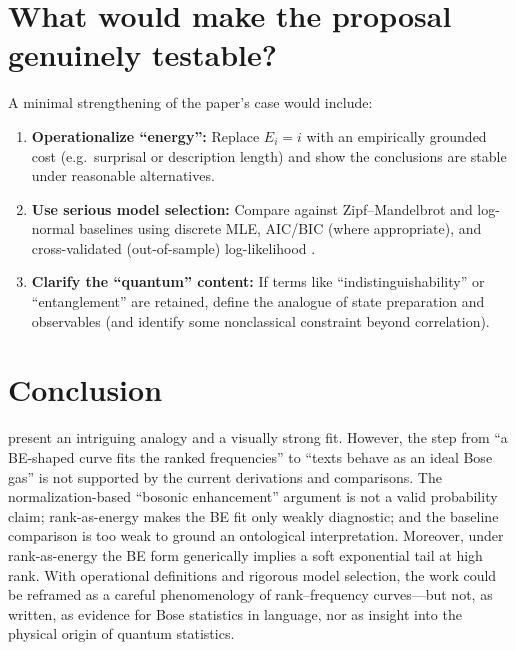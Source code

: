 \documentclass[11pt,a4paper]{article}
\begin{document}
\section{What would make the proposal genuinely testable?}
A minimal strengthening of the paper’s case would include:
\begin{enumerate}
\item \textbf{Operationalize ``energy'':} Replace $E_i=i$ with an empirically grounded cost (e.g.\ surprisal or description length) and show the conclusions are stable under reasonable alternatives.
\item \textbf{Use serious model selection:} Compare against Zipf--Mandelbrot and log-normal baselines using discrete MLE, AIC/BIC (where appropriate), and cross-validated (out-of-sample) log-likelihood \citep{Clauset2009}.
\item \textbf{Clarify the ``quantum'' content:} If terms like ``indistinguishability'' or ``entanglement'' are retained, define the analogue of state preparation and observables (and identify some nonclassical constraint beyond correlation).
\end{enumerate}

\section{Conclusion}
\citet{Aerts2024Origin} present an intriguing analogy and a visually strong fit. However, the step from ``a BE-shaped curve fits the ranked frequencies'' to ``texts behave as an ideal Bose gas'' is not supported by the current derivations and comparisons. The normalization-based ``bosonic enhancement'' argument is not a valid probability claim; rank-as-energy makes the BE fit only weakly diagnostic; and the baseline comparison is too weak to ground an ontological interpretation. Moreover, under rank-as-energy the BE form generically implies a soft exponential tail at high rank. With operational definitions and rigorous model selection, the work could be reframed as a careful phenomenology of rank--frequency curves---but not, as written, as evidence for Bose statistics in language, nor as insight into the physical origin of quantum statistics.
\end{document}
